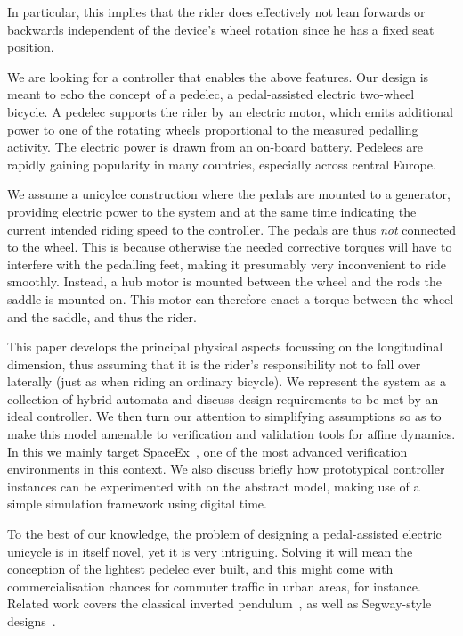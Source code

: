 \documentclass[copyright,submission]{eptcs}
\begin{document}
In particular, this implies that the rider does effectively not lean
forwards or backwards independent of the device's wheel rotation since
he has a fixed seat position.

We are looking for a controller that enables the above features. Our
design is meant to echo the concept of a pedelec, a pedal-assisted
electric two-wheel bicycle. A pedelec supports the rider by an
electric motor, which emits additional power to one of the rotating
wheels proportional to the measured pedalling activity. The electric
power is drawn from an on-board battery. Pedelecs are rapidly gaining
popularity in many countries, especially across central Europe.

We assume a unicylce construction where the pedals are mounted to a
generator, providing electric power to the system and at the same time
indicating the current intended riding speed to the controller. The
pedals are thus \emph{not} connected to the wheel. This is because
otherwise the needed corrective torques will have to interfere with
the pedalling feet, making it presumably very inconvenient to ride
smoothly.  Instead, a hub motor is mounted between the wheel and the
rods the saddle is mounted on. This motor can therefore enact a torque
between the wheel and the saddle, and thus the rider.


This paper develops the principal physical aspects focussing on the
longitudinal dimension, thus assuming that it is the rider's
responsibility not to fall over laterally (just as when riding an
ordinary bicycle). We represent the system as a collection of hybrid
automata and discuss design requirements to be met by an ideal
controller. We then turn our attention to simplifying assumptions so
as to make this model amenable to verification and validation tools
for affine dynamics. In this we mainly target
SpaceEx~\cite{DBLP:conf/cav/FrehseGDCRLRGDM11}, one of the most
advanced verification environments in this context.
We also discuss briefly how
prototypical controller instances can be experimented with on the
abstract model, making use of a simple simulation framework using
digital time.


To the best of our knowledge, the problem of designing a
pedal-assisted electric unicycle is in itself novel, yet it is very
intriguing. Solving it will mean the conception of the lightest
pedelec ever built, and this might come with commercialisation chances
for commuter traffic in urban areas, for instance. Related work covers
the classical inverted pendulum~\cite{DBLP:journals/robotica/FengY88},
as well as Segway-style designs~\cite{chessway}.
\end{document}
